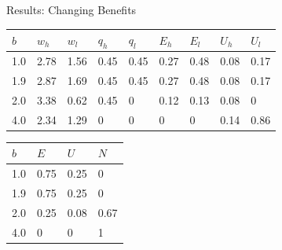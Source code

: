 \documentclass[lualatex]{beamer}
\begin{document}
\begin{frame}{Results: Changing Benefits}

	\begin{table}[]\small
	\begin{tabular}{|l|l|l|l|l|l|l|l|l|}
	\hline
	   $b$     & $w_h$ & $w_l$ & $q_h$ & $q_l$ & $E_h$ & $E_l$ & $U_h$ & $U_l$ \\ \hline
	1.0 & 2.78  & 1.56  & 0.45  & 0.45  & 0.27  & 0.48  & 0.08  & 0.17  \\ \hline
	1.9 & 2.87 & 1.69 & 0.45 & 0.45 & 0.27 & 0.48 & 0.08 & 0.17 \\ \hline
	2.0 & 3.38  & 0.62  & 0.45  & 0     & 0.12  & 0.13  & 0.08  & 0     \\ \hline
	4.0 & 2.34  & 1.29  & 0     & 0     & 0     & 0     & 0.14  & 0.86  \\ \hline
	\end{tabular}
	\end{table}

	\begin{table}[]
\begin{tabular}{|l|l|l|l|}
\hline
    $b$    & $E$  & $U$  & $N$  \\ \hline
1.0 & 0.75 & 0.25 & 0    \\ \hline
1.9 & 0.75 & 0.25 & 0 \\ \hline
2.0 & 0.25 & 0.08 & 0.67 \\ \hline
4.0 & 0    & 0    & 1    \\ \hline
\end{tabular}
\end{table}

\end{frame}
\end{document}
